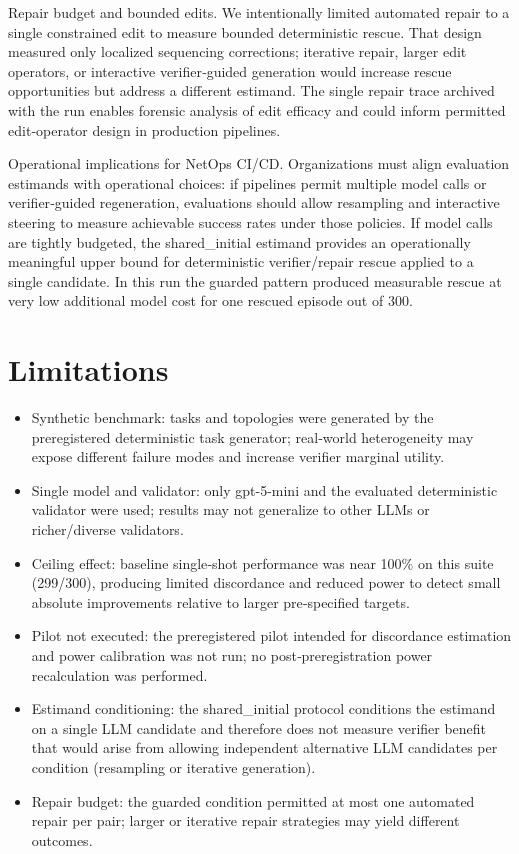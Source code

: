 \documentclass[conference]{IEEEtran}
\begin{document}
Repair budget and bounded edits. We intentionally limited automated repair to a single constrained edit to measure bounded deterministic rescue. That design measured only localized sequencing corrections; iterative repair, larger edit operators, or interactive verifier‑guided generation would increase rescue opportunities but address a different estimand. The single repair trace archived with the run enables forensic analysis of edit efficacy and could inform permitted edit‑operator design in production pipelines.

Operational implications for NetOps CI/CD. Organizations must align evaluation estimands with operational choices: if pipelines permit multiple model calls or verifier‑guided regeneration, evaluations should allow resampling and interactive steering to measure achievable success rates under those policies. If model calls are tightly budgeted, the shared\_initial estimand provides an operationally meaningful upper bound for deterministic verifier/repair rescue applied to a single candidate. In this run the guarded pattern produced measurable rescue at very low additional model cost for one rescued episode out of 300.

\section{Limitations}
\begin{itemize}
\item Synthetic benchmark: tasks and topologies were generated by the preregistered deterministic task generator; real‑world heterogeneity may expose different failure modes and increase verifier marginal utility.
\item Single model and validator: only gpt-5-mini and the evaluated deterministic validator were used; results may not generalize to other LLMs or richer/diverse validators.
\item Ceiling effect: baseline single‑shot performance was near 100\% on this suite (299/300), producing limited discordance and reduced power to detect small absolute improvements relative to larger pre‑specified targets.
\item Pilot not executed: the preregistered pilot intended for discordance estimation and power calibration was not run; no post‑preregistration power recalculation was performed.
\item Estimand conditioning: the shared\_initial protocol conditions the estimand on a single LLM candidate and therefore does not measure verifier benefit that would arise from allowing independent alternative LLM candidates per condition (resampling or iterative generation).
\item Repair budget: the guarded condition permitted at most one automated repair per pair; larger or iterative repair strategies may yield different outcomes.
\end{itemize}
\end{document}
